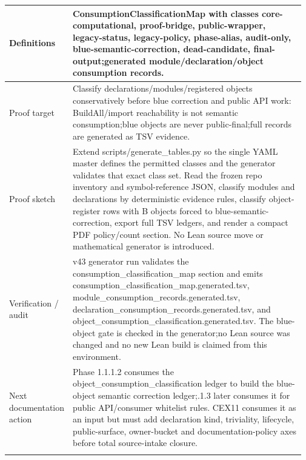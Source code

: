 \begin{longtable}{L{0.16\linewidth} L{0.81\linewidth}}
\hline\addlinespace[0.20em]
Definitions & ConsumptionClassificationMap with classes core-computational, proof-bridge, public-wrapper, legacy-status, legacy-policy, phase-alias, audit-only, blue-semantic-correction, dead-candidate, final-output;\newline generated module/\allowbreak{}declaration/\allowbreak{}object consumption records.\\
\hline\addlinespace[0.20em]
Proof target & Classify declarations/\allowbreak{}modules/\allowbreak{}registered objects conservatively before blue correction and public API work: BuildAll/\allowbreak{}import reachability is not semantic consumption;\newline blue objects are never public-final;\newline full records are generated as TSV evidence.\\
\hline\addlinespace[0.20em]
Proof sketch & Extend scripts/\allowbreak{}generate\_tables.py so the single YAML master defines the permitted classes and the generator validates that exact class set. Read the frozen repo inventory and symbol-reference JSON, classify modules and declarations by deterministic evidence rules, classify object-register rows with B objects forced to blue-semantic-correction, export full TSV ledgers, and render a compact PDF policy/\allowbreak{}count section. No Lean source move or mathematical generator is introduced.\\
\hline\addlinespace[0.20em]
Verification /\allowbreak{} audit & v43 generator run validates the consumption\_classification\_map section and emits consumption\_classification\_map.generated.tsv, module\_consumption\_records.generated.tsv, declaration\_consumption\_records.generated.tsv, and object\_consumption\_classification.generated.tsv. The blue-object gate is checked in the generator;\newline no Lean source was changed and no new Lean build is claimed from this environment.\\
\hline\addlinespace[0.20em]
Next documentation action & Phase 1.1.1.2 consumes the object\_consumption\_classification ledger to build the blue-object semantic correction ledger;.1.3 later consumes it for public API/\allowbreak{}consumer whitelist rules. CEX11 consumes it as an input but must add declaration kind, triviality, lifecycle, public-surface, owner-bucket and documentation-policy axes before total source-intake closure.\\
\hline\addlinespace[0.20em]
\end{longtable}
